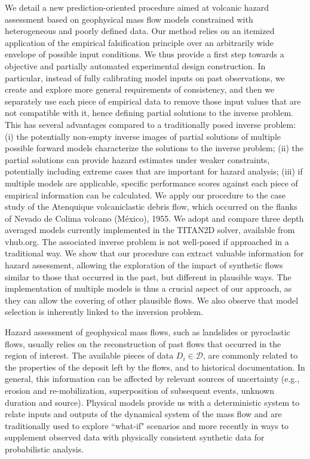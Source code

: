 \documentclass[nhess, manuscript]{copernicus}
\begin{document}
\abstract
We detail a new prediction-oriented procedure aimed at volcanic hazard assessment based on geophysical mass flow models constrained with heterogeneous and poorly defined data. Our method relies on an itemized application of the empirical falsification principle over an arbitrarily wide envelope of possible input conditions. We thus provide a first step towards a objective and partially automated experimental design construction. In particular, instead of fully calibrating model inputs on past observations, we create and explore more general requirements of consistency, and then we separately use each piece of empirical data to remove those input values that are not compatible with it, hence defining partial solutions to the inverse problem. This has several advantages compared to a traditionally posed inverse problem: (i) the potentially non-empty  inverse images of partial solutions of multiple possible forward models characterize the solutions to the inverse problem; (ii) the partial solutions can provide hazard estimates under weaker constraints, potentially including extreme cases that are important for hazard analysis; (iii) if multiple models are applicable, specific performance scores against each piece of empirical information can be calculated. We apply our procedure to the case study of the Atenquique volcaniclastic debris flow, which occurred on the flanks of Nevado de Colima volcano (M\'exico), 1955. We adopt and compare three depth averaged models currently implemented in the TITAN2D solver, available from vhub.org. The associated inverse problem is not well-posed if approached in a traditional way. We show that our procedure can extract valuable information for hazard assessment, allowing the exploration of the impact of synthetic flows similar to those that occurred in the past, but different in plausible ways. The implementation of multiple models is thus a crucial aspect of our approach, as they can allow the covering of other plausible flows. We also observe that model selection is inherently linked to the inversion problem.


\newpage
\introduction
Hazard assessment of geophysical mass flows, such as landslides or pyroclastic flows, usually relies on the reconstruction of past flows that occurred in the region of interest. The available pieces of data $D_i\in\mathcal D$, are commonly related to the properties of the deposit left by the flows, and to historical documentation. In general, this information can be affected by relevant sources of uncertainty (e.g., erosion and re-mobilization, superposition of subsequent events, unknown duration and source). Physical models provide us with a deterministic system to relate inputs and outputs of the dynamical system of the mass flow \citep{Gilbert91, Patra2018a} and are traditionally used to explore ``what-if" scenarios and more recently in ways to supplement observed data with physically consistent synthetic data \citep{Bayarri2015} for probabilistic analysis.
\end{document}
